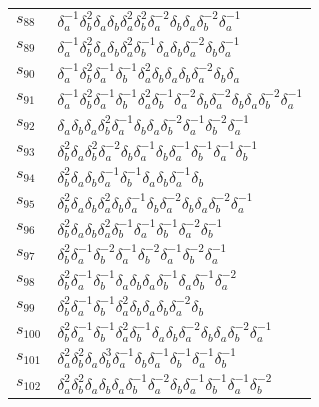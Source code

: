 \documentclass{article}
\begin{document}
\begin{center}
\begin{tabular}{ll}
$s_{88}$ & $\delta_a^{-1}\delta_b^{2}\delta_a^{}\delta_b^{}\delta_a^{2}\delta_b^{2}\delta_a^{-2}\delta_b^{}\delta_a^{}\delta_b^{-2}\delta_a^{-1}$ \\
$s_{89}$ & $\delta_a^{-1}\delta_b^{2}\delta_a^{}\delta_b^{}\delta_a^{2}\delta_b^{-1}\delta_a^{}\delta_b^{}\delta_a^{-2}\delta_b^{}\delta_a^{-1}$ \\
$s_{90}$ & $\delta_a^{-1}\delta_b^{2}\delta_a^{-1}\delta_b^{-1}\delta_a^{2}\delta_b^{}\delta_a^{}\delta_b^{}\delta_a^{-2}\delta_b^{}\delta_a^{}$ \\
$s_{91}$ & $\delta_a^{-1}\delta_b^{2}\delta_a^{-1}\delta_b^{-1}\delta_a^{2}\delta_b^{-1}\delta_a^{-2}\delta_b^{}\delta_a^{-2}\delta_b^{}\delta_a^{}\delta_b^{-2}\delta_a^{-1}$ \\
$s_{92}$ & $\delta_a^{}\delta_b^{}\delta_a^{}\delta_b^{2}\delta_a^{-1}\delta_b^{}\delta_a^{}\delta_b^{-2}\delta_a^{-1}\delta_b^{-2}\delta_a^{-1}$ \\
$s_{93}$ & $\delta_b^{2}\delta_a^{}\delta_b^{2}\delta_a^{-2}\delta_b^{}\delta_a^{-1}\delta_b^{}\delta_a^{-1}\delta_b^{-1}\delta_a^{-1}\delta_b^{-1}$ \\
$s_{94}$ & $\delta_b^{2}\delta_a^{}\delta_b^{}\delta_a^{-1}\delta_b^{-1}\delta_a^{}\delta_b^{}\delta_a^{-1}\delta_b^{}$ \\
$s_{95}$ & $\delta_b^{2}\delta_a^{}\delta_b^{}\delta_a^{2}\delta_b^{}\delta_a^{-1}\delta_b^{}\delta_a^{-2}\delta_b^{}\delta_a^{}\delta_b^{-2}\delta_a^{-1}$ \\
$s_{96}$ & $\delta_b^{2}\delta_a^{}\delta_b^{}\delta_a^{2}\delta_b^{-1}\delta_a^{-1}\delta_b^{-1}\delta_a^{-2}\delta_b^{-1}$ \\
$s_{97}$ & $\delta_b^{2}\delta_a^{-1}\delta_b^{-2}\delta_a^{-1}\delta_b^{-2}\delta_a^{-1}\delta_b^{-2}\delta_a^{-1}$ \\
$s_{98}$ & $\delta_b^{2}\delta_a^{-1}\delta_b^{-1}\delta_a^{}\delta_b^{}\delta_a^{}\delta_b^{-1}\delta_a^{}\delta_b^{-1}\delta_a^{-2}$ \\
$s_{99}$ & $\delta_b^{2}\delta_a^{-1}\delta_b^{-1}\delta_a^{2}\delta_b^{}\delta_a^{}\delta_b^{}\delta_a^{-2}\delta_b^{}$ \\
$s_{100}$ & $\delta_b^{2}\delta_a^{-1}\delta_b^{-1}\delta_a^{2}\delta_b^{-1}\delta_a^{}\delta_b^{}\delta_a^{-2}\delta_b^{}\delta_a^{}\delta_b^{-2}\delta_a^{-1}$ \\
$s_{101}$ & $\delta_a^{2}\delta_b^{2}\delta_a^{}\delta_b^{3}\delta_a^{-1}\delta_b^{}\delta_a^{-1}\delta_b^{-1}\delta_a^{-1}\delta_b^{-1}$ \\
$s_{102}$ & $\delta_a^{2}\delta_b^{2}\delta_a^{}\delta_b^{}\delta_a^{}\delta_b^{-1}\delta_a^{-2}\delta_b^{}\delta_a^{-1}\delta_b^{-1}\delta_a^{-1}\delta_b^{-2}$ \\

\end{tabular}
\end{center}
\end{document}
